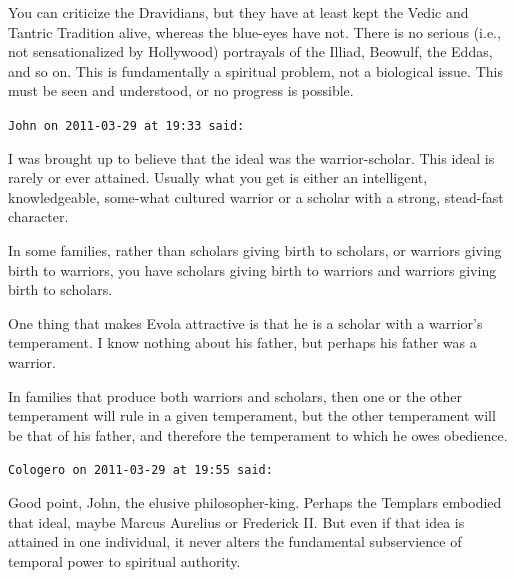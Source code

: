 \begin{footnotesize}
\begin{sffamily}
You can criticize the Dravidians, but they have at least kept the Vedic and Tantric Tradition alive, whereas the blue-eyes have not. There is no serious (i.e., not sensationalized by Hollywood) portrayals of the Illiad, Beowulf, the Eddas, and so on. This is fundamentally a spiritual problem, not a biological issue. This must be seen and understood, or no progress is possible.

\hfill

\texttt{John on 2011-03-29 at 19:33 said:}

I was brought up to believe that the ideal was the warrior-scholar. This ideal is rarely or ever attained. Usually what you get is either an intelligent, knowledgeable, some-what cultured warrior or a scholar with a strong, stead-fast character.

In some families, rather than scholars giving birth to scholars, or warriors giving birth to warriors, you have scholars giving birth to warriors and warriors giving birth to scholars.

One thing that makes Evola attractive is that he is a scholar with a warrior's temperament. I know nothing about his father, but perhaps his father was a warrior.

In families that produce both warriors and scholars, then one or the other temperament will rule in a given temperament, but the other temperament will be that of his father, and therefore the temperament to which he owes obedience.

\hfill

\texttt{Cologero on 2011-03-29 at 19:55 said:}

Good point, John, the elusive philosopher-king. Perhaps the Templars embodied that ideal, maybe Marcus Aurelius or Frederick II. But even if that idea is attained in one individual, it never alters the fundamental subservience of temporal power to spiritual authority.

\end{sffamily}
\end{footnotesize}

